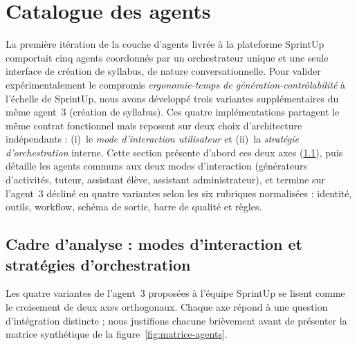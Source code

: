 \section{Catalogue des agents}
\label{sec:catalogue-agents}

La première itération de la couche d'agents livrée à la plateforme
SprintUp comportait cinq agents coordonnés par un orchestrateur unique
et une seule interface de création de syllabus, de nature
conversationnelle. Pour valider expérimentalement le compromis
\emph{ergonomie-temps de génération-contrôlabilité} à l'échelle de
SprintUp, nous avons développé trois variantes supplémentaires du même
agent~3 (création de syllabus). Ces quatre implémentations partagent le
même contrat fonctionnel mais reposent sur deux choix d'architecture
indépendants : (i)~le \emph{mode d'interaction utilisateur} et (ii)~la
\emph{stratégie d'orchestration} interne. Cette section présente d'abord
ces deux axes (\textsection\ref{sec:axes}), puis détaille les agents
communs aux deux modes d'interaction (générateurs d'activités, tuteur,
assistant élève, assistant administrateur), et termine sur l'agent~3
décliné en quatre variantes selon les six rubriques normalisées :
identité, outils, workflow, schéma de sortie, barre de qualité et
règles.

\subsection{Cadre d'analyse : modes d'interaction et stratégies
d'orchestration}
\label{sec:axes}

Les quatre variantes de l'agent~3 proposées à l'équipe SprintUp se
lisent comme le croisement de deux axes orthogonaux. Chaque axe répond
à une question d'intégration distincte ; nous justifions chacune
brièvement avant de présenter la matrice synthétique de la
figure~\ref{fig:matrice-agents}.

